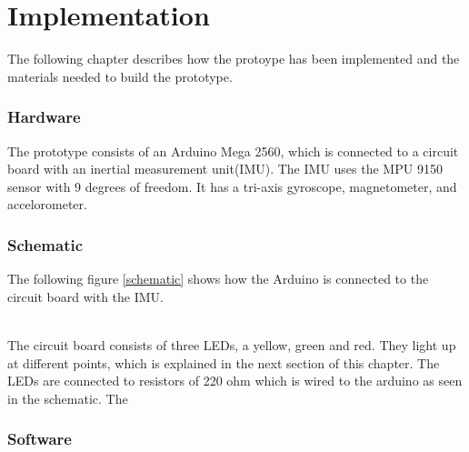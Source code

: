 \chapter{Implementation}

The following chapter describes how the protoype has been implemented and the materials needed to build the prototype. 

\subsection{Hardware}

The prototype consists of an Arduino Mega 2560\citep{Arduino}, which is connected to a circuit board with an inertial measurement unit(IMU). 
The IMU uses the MPU 9150 sensor with 9 degrees of freedom\citep{MPU}. It has a tri-axis gyroscope, magnetometer, and accelorometer.

\subsection{Schematic} 

The following figure \ref{schematic} shows how the Arduino is connected to the circuit board with the IMU. 

\begin{minipage}{\linewidth}%
\label{schematic}
\end{minipage}\\

The circuit board consists of three LEDs, a yellow, green and red. They light up at different points, which is explained in the next section of this chapter.
The LEDs are connected to resistors of 220 ohm which is wired to the arduino as seen in the schematic. 
The 

\subsection{Software}
